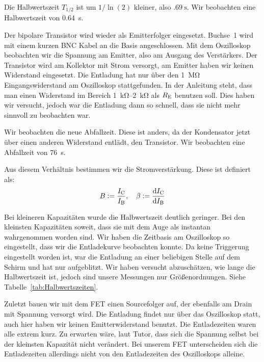 Die Halbwertszeit $T_{1/2}$ ist um $1/\ln(2)$ kleiner, also $\SI{.69}\second$.
Wir beobachten eine Halbwertszeit von \SI{0.64}{\second}.

Der bipolare Transistor wird wieder als Emitterfolger eingesetzt. Buchse~1 wird
mit einem kurzen BNC Kabel an die Basis angeschlossen. Mit dem Oszilloskop
beobachten wir die Spannung am Emitter, also am Ausgang des Verstärkers. Der
Transistor wird am Kollektor mit Strom versorgt, am Emitter haben wir keinen
Widerstand eingesetzt. Die Entladung hat nur über den \SI{1}{\mega\ohm}
Eingangswiderstand am Oszilloskop stattgefunden. In der Anleitung steht, dass
man einen Widerstand im Bereich \SIrange{1}{2}{\kilo\ohm} als $R_\text{E}$ benutzen
soll. Dies haben wir versucht, jedoch war die Entladung dann so schnell, dass
sie nicht mehr sinnvoll zu beobachten war.

Wir beobachten die neue Abfallzeit. Diese ist anders, da der Kondensator jetzt
über einen anderen Widerstand entlädt, den Transistor. Wir beobachten eine
Abfallzeit von \SI{76}{\second}.

Aus diesem Verhältnis bestimmen wir die Stromverstärkung. Diese ist definiert
als:
\[
	B := \frac\IC\IB
	\eqnsep
	\beta := \frac{\dif\IC}{\dif\IB}
\]



Bei kleineren Kapazitäten wurde die Halbwertszeit deutlich geringer. Bei den
kleinsten Kapazitäten soweit, dass sie mit dem Auge als instantan wahrgenommen
worden sind. Wir haben die Zeitbasis am Oszilloskop so eingestellt, dass wir
die Entladekurve beobachten konnte. Da keine Triggerung eingestellt worden ist,
war die Entladung an einer beliebigen Stelle auf dem Schirm und hat nur
aufgeblitzt. Wir haben versucht abzuschätzen, wie lange die Halbwertszeit ist,
jedoch sind unsere Messungen nur Größenordnungen. Siehe
Tabelle~\ref{tab:Halbwertszeiten}.

Zuletzt bauen wir mit dem FET einen Sourcefolger auf, der ebenfalls am Drain
mit Spannung versorgt wird. Die Entladung findet nur über das Oszilloskop
statt, auch hier haben wir keinen Emitterwiderstand benutzt. Die Entladezeiten
waren alle extrem kurz. Zu erwarten wäre, laut Tutor, dass sich die Spannung
selbst bei der kleinsten Kapazität nicht verändert. Bei unserem FET
unterscheiden sich die Entladezeiten allerdings nicht von den Entladezeiten des
Oszilloskops alleine.

